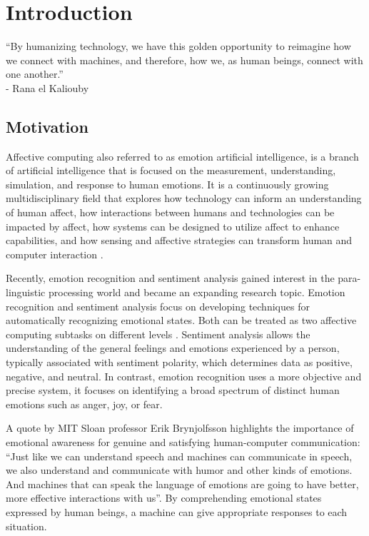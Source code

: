 \chapter{Introduction}
\label{chapter:introduction}

\begin{introduction}
	“By humanizing technology, we have this golden opportunity to reimagine how we connect with machines, and therefore, how we, as human beings, connect with one another.”\\- Rana el Kaliouby \cite{ranaTedTalk}
\end{introduction}

\section{Motivation}

Affective computing also referred to as emotion artificial intelligence, is a branch of artificial intelligence that is focused on the measurement, understanding, simulation, and response to human emotions. It is a continuously growing multidisciplinary field that explores how technology can inform an understanding of human affect, how interactions between humans and technologies can be impacted by affect, how systems can be designed to utilize affect to enhance capabilities, and how sensing and affective strategies can transform human and computer interaction \cite{Daily2017}. 

Recently, emotion recognition and sentiment analysis gained interest in the para-linguistic processing world and became an expanding research topic. Emotion recognition and sentiment analysis focus on developing techniques for automatically recognizing emotional states. Both can be treated as two affective computing subtasks on different levels \cite{PORIA201798}. Sentiment analysis allows the understanding of the general feelings and emotions experienced by a person, typically associated with sentiment polarity, which determines data as positive, negative, and neutral. In contrast, emotion recognition uses a more objective and precise system, it focuses on identifying a broad spectrum of distinct human emotions such as anger, joy, or fear.

A quote by MIT Sloan professor Erik Brynjolfsson highlights the importance of emotional awareness for genuine and satisfying human-computer communication: “Just like we can understand speech and machines can communicate in speech, we also understand and communicate with humor and other kinds of emotions. And machines that can speak the language of emotions are going to have better, more effective interactions with us”. By comprehending emotional states expressed by human beings, a machine can give appropriate responses to each situation.

